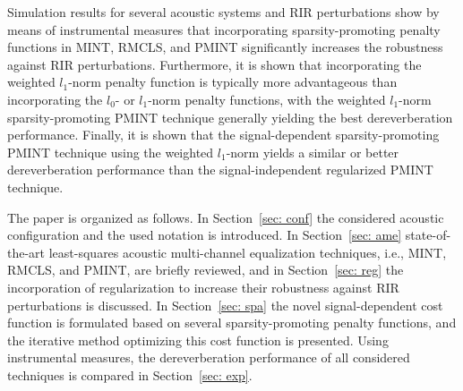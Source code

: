 \documentclass[10pt]{IEEEtran}
\begin{document}
Simulation results for several acoustic systems and RIR perturbations show by means of instrumental measures that incorporating sparsity-promoting penalty functions in MINT, RMCLS, and PMINT significantly increases the robustness against RIR perturbations.
Furthermore, it is shown that incorporating the weighted $l_1$-norm penalty function is typically more advantageous than incorporating the $l_0$- or $l_1$-norm penalty functions, with the weighted $l_1$-norm sparsity-promoting PMINT technique generally yielding the best dereverberation performance.
Finally, it is shown that the signal-dependent sparsity-promoting PMINT technique using the weighted $l_1$-norm yields a similar or better dereverberation performance than the signal-independent regularized PMINT technique.

The paper is organized as follows.
In Section~\ref{sec: conf} the considered acoustic configuration and the used notation is introduced. 
In Section~\ref{sec: ame} state-of-the-art least-squares acoustic multi-channel equalization techniques, i.e., MINT, RMCLS, and PMINT, are briefly reviewed, and in Section~\ref{sec: reg} the incorporation of regularization to increase their robustness against RIR perturbations is discussed.
In Section~\ref{sec: spa} the novel signal-dependent cost function is formulated based on several sparsity-promoting penalty functions, and the iterative method optimizing this cost function is presented.
Using instrumental measures, the dereverberation performance of all considered techniques is compared in Section~\ref{sec: exp}.
\end{document}
